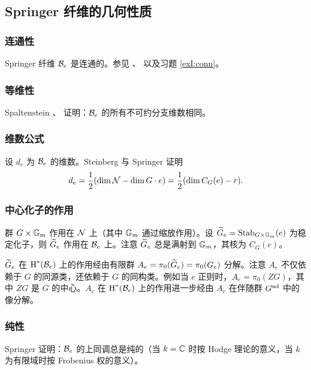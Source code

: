 \subsection{Springer 纤维的几何性质}

\subsubsection{连通性} Springer 纤维 $\mathcal{B}_{e}$ 是连通的。参见 \cite[p.131, Prop 1]{StConj}、\cite[Ch II, Cor 1.7]{Spaltenstein} 以及习题 \ref{exI:conn}。

\subsubsection{等维性} Spaltenstein \cite{Spa77}、\cite[Ch II, Prop 1.12]{Spaltenstein} 证明：$\mathcal{B}_{e}$ 的所有不可约分支维数相同。

\subsubsection{维数公式} 设 $d_{e}$ 为 $\mathcal{B}_{e}$ 的维数。Steinberg \cite[Thm 4.6]{St} 与 Springer \cite{Springer} 证明
\begin{equation}\label{Spr dim}
d_{e}=\frac{1}{2}(\dim\mathcal{N}-\dim G\cdot e)=\frac{1}{2}(\dim C_{G}(e)-r).
\end{equation}

\subsubsection{中心化子的作用} 群 $G\times \mathbb{G}_m$ 作用在 $\mathcal{N}$ 上（其中 $\mathbb{G}_m$ 通过缩放作用）。设 $\widetilde{G}_{e}=\textup{Stab}_{G\times \mathbb{G}_m}(e)$ 为稳定化子，则 $\widetilde{G}_{e}$ 作用在 $\mathcal{B}_{e}$ 上。注意 $\widetilde{G}_{e}$ 总是满射到 $\mathbb{G}_m$，其核为 $C_{G}(e)$。

$\widetilde{G}_{e}$ 在 $\textup{H}^{*}({\mathcal{B}_{e}})$ 上的作用经由有限群 $A_{e}=\pi_{0}(\widetilde{G}_{e})=\pi_{0}(G_{e})$ 分解。注意 $A_{e}$ 不仅依赖于 $G$ 的同源类，还依赖于 $G$ 的同构类。例如当 $e$ 正则时，$A_{e}=\pi_{0}(ZG)$，其中 $ZG$ 是 $G$ 的中心。$A_{e}$ 在 $\textup{H}^{*}({\mathcal{B}_{e}})$ 上的作用进一步经由 $A_{e}$ 在伴随群 $G^{\textup{ad}}$ 中的像分解。

\subsubsection{纯性} Springer \cite{SpringerPure} 证明：$\mathcal{B}_{e}$ 的上同调总是纯的（当 $k=\mathbb{C}$ 时按 Hodge 理论的意义，当 $k$ 为有限域时按 Frobenius 权的意义）。


